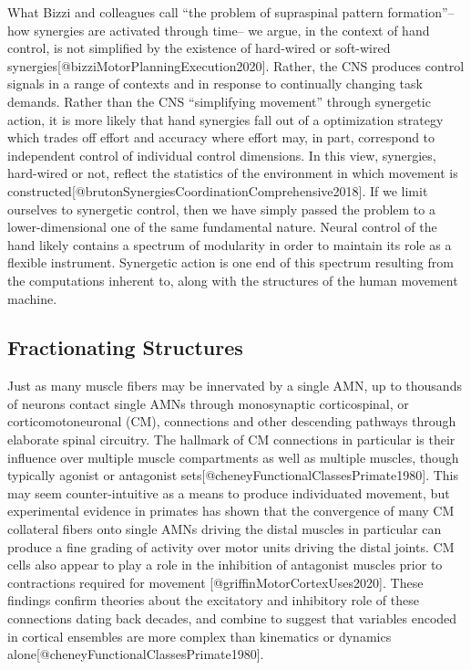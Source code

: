 What Bizzi and colleagues call ``the problem of supraspinal pattern
formation''--how synergies are activated through time-- we argue, in the
context of hand control, is not simplified by the existence of
hard-wired or soft-wired
synergies{[}@bizziMotorPlanningExecution2020{]}. Rather, the CNS
produces control signals in a range of contexts and in response to
continually changing task demands. Rather than the CNS ``simplifying
movement'' through synergetic action, it is more likely that hand
synergies fall out of a optimization strategy which trades off effort
and accuracy where effort may, in part, correspond to independent
control of individual control dimensions. In this view, synergies,
hard-wired or not, reflect the statistics of the environment in which
movement is
constructed{[}@brutonSynergiesCoordinationComprehensive2018{]}. If we
limit ourselves to synergetic control, then we have simply passed the
problem to a lower-dimensional one of the same fundamental nature.
Neural control of the hand likely contains a spectrum of modularity in
order to maintain its role as a flexible instrument. Synergetic action
is one end of this spectrum resulting from the computations inherent to,
along with the structures of the human movement machine.

\subsection{Fractionating Structures}\label{fractionating-structures}

Just as many muscle fibers may be innervated by a single AMN, up to
thousands of neurons contact single AMNs through monosynaptic
corticospinal, or corticomotoneuronal (CM), connections and other
descending pathways through elaborate spinal circuitry. The hallmark of
CM connections in particular is their influence over multiple muscle
compartments as well as multiple muscles, though typically agonist or
antagonist sets{[}@cheneyFunctionalClassesPrimate1980{]}. This may seem
counter-intuitive as a means to produce individuated movement, but
experimental evidence in primates has shown that the convergence of many
CM collateral fibers onto single AMNs driving the distal muscles in
particular can produce a fine grading of activity over motor units
driving the distal joints. CM cells also appear to play a role in the
inhibition of antagonist muscles prior to contractions required for
movement {[}@griffinMotorCortexUses2020{]}. These findings confirm
theories about the excitatory and inhibitory role of these connections
dating back decades, and combine to suggest that variables encoded in
cortical ensembles are more complex than kinematics or dynamics
alone{[}@cheneyFunctionalClassesPrimate1980{]}.

